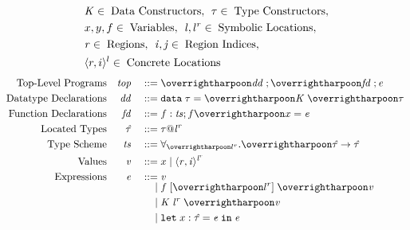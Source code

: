 \begin{displaymath}
  \begin{aligned}
  &\mathit{K} \in \; \textup{Data Constructors},\:\: \mathit{\tau} \in \; \textup{Type Constructors},\\
  &x, y,f \in \; \textup{Variables},\:\:
  \mathit{l}, {l}^{r} \in \; \textup{Symbolic Locations},\\
  &\mathit{r} \in \; \textup{Regions},\:\: \mathit{i}, \mathit{j} \in \; \textup{Region Indices},\\
  &\langle r, i \rangle ^{l} \in \; \textup{Concrete Locations}
  \end{aligned}
\end{displaymath}
\begin{displaymath}
  \begin{aligned}
    \textup{Top-Level Programs} && \PROG && \gramdef & \overharpoon{\DD} \;; \overharpoon{\FD} \;; \EXPR \\
    \textup{Datatype Declarations} && \DD && \gramdef & \DATA\;\TYP = \overharpoon{\DC \; \overharpoon{\sTYP}\;} \\
    \textup{Function Declarations} && \FD && \gramdef & \fvar : \TS ; \fvar \overharpoon{\var} = \EXPR \\
    \textup{Located Types} && \hTYP && \gramdef & \tyatlocreg{\TYP}{\loc}{\reg} \\
    \textup{Type Scheme} && \TS && \gramdef &
      \forall _{\overharpoon{\locreg{l}{r}}}.
      \overharpoon{\hTYP} \ARROW \hTYP \\
    \textup{Values} && \VAL && \gramdef & \var \gramor \concreteloc{\reg}{\ind}{\locreg{\loc}{\reg}}\\
    \textup{Expressions} && \EXPR && \gramdef & \VAL\\[-5pt]
    && && \gramor & \fapp{\overharpoon{\locreg{l}{r}}}{\overharpoon{\VAL}} \\
    && && \gramor & \datacon{\DC}{\keywd{\locreg{\loc}{\reg}}}{\overharpoon{\VAL}}\\
    && && \gramor & \letpack{\var:\hTYP}{\EXPR}{\EXPR} \\

\end{aligned}
\end{displaymath}

